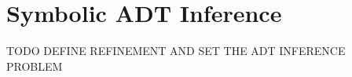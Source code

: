 \section{Symbolic ADT Inference}
\label{sec:inference}

TODO DEFINE REFINEMENT AND SET THE ADT INFERENCE PROBLEM
